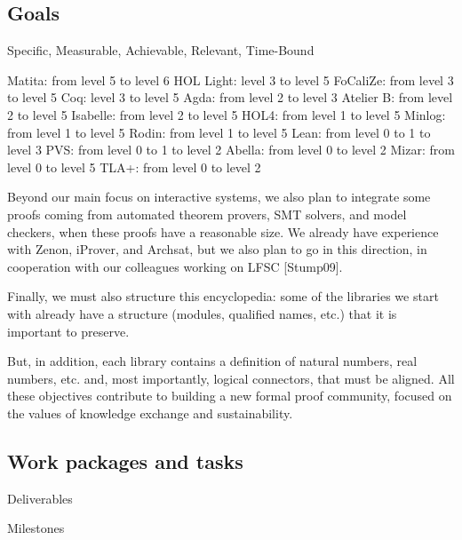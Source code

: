 \subsection{Goals}

Specific, Measurable, Achievable, Relevant, Time-Bound

Matita: from level 5 to level 6
HOL Light: level 3 to level 5
FoCaliZe: from level 3 to level 5
Coq: level 3 to level 5
Agda: from level 2 to level 3
Atelier B: from level 2 to level 5
Isabelle: from level 2 to level 5
HOL4: from level 1 to level 5
Minlog: from level 1 to level 5
Rodin: from level 1 to level 5
Lean: from level 0 to 1 to level 3
PVS: from level 0 to 1 to level 2
Abella: from level 0 to level 2
Mizar: from level 0 to level 5
TLA+: from level 0 to level 2

Beyond our main focus on interactive systems, we also plan to
integrate some proofs coming from automated theorem provers, SMT
solvers, and model checkers, when these proofs have a reasonable
size. We already have experience with Zenon, iProver, and Archsat, but
we also plan to go in this direction, in cooperation with our
colleagues working on LFSC [Stump09].

Finally, we must also structure this encyclopedia: some of the
libraries we start with already have a structure (modules, qualified
names, etc.) that it is important to preserve.

But, in addition, each library contains a definition of natural
numbers, real numbers, etc. and, most importantly, logical connectors,
that must be aligned.  All these objectives contribute to building a
new formal proof community, focused on the values of knowledge
exchange and sustainability.


\subsection{Work packages and tasks}



Deliverables


Milestones


